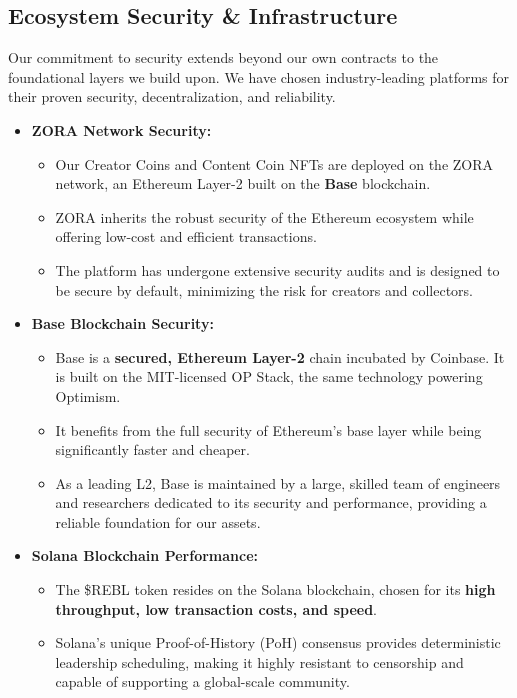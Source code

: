 \documentclass{article}
\begin{document}
\begin{tcolorbox}[colback=headerColor!10!white, colframe=headerColor, boxrule=2pt, width=\textwidth, arc=6mm, left=8mm, right=8mm, top=6mm, bottom=6mm]
\subsection[
  \texorpdfstring{\color{primaryColor}Ecosystem Security \& Infrastructure}{Ecosystem Security \& Infrastructure}
]{\color{primaryColor}\textbf{Ecosystem Security \& Infrastructure}}

Our commitment to security extends beyond our own contracts to the foundational layers we build upon. We have chosen industry-leading platforms for their proven security, decentralization, and reliability.

\begin{itemize}
    \item \textbf{ZORA Network Security:}
    \begin{itemize}
        \item Our Creator Coins and Content Coin NFTs are deployed on the ZORA network, an Ethereum Layer-2 built on the \textbf{Base} blockchain.
        \item ZORA inherits the robust security of the Ethereum ecosystem while offering low-cost and efficient transactions.
        \item The platform has undergone extensive security audits and is designed to be secure by default, minimizing the risk for creators and collectors.
    \end{itemize}
    \item \textbf{Base Blockchain Security:}
    \begin{itemize}
        \item Base is a \textbf{secured, Ethereum Layer-2} chain incubated by Coinbase. It is built on the MIT-licensed OP Stack, the same technology powering Optimism.
        \item It benefits from the full security of Ethereum's base layer while being significantly faster and cheaper.
        \item As a leading L2, Base is maintained by a large, skilled team of engineers and researchers dedicated to its security and performance, providing a reliable foundation for our assets.
    \end{itemize}
    \item \textbf{Solana Blockchain Performance:}
    \begin{itemize}
        \item The \$REBL token resides on the Solana blockchain, chosen for its \textbf{high throughput, low transaction costs, and speed}.
        \item Solana's unique Proof-of-History (PoH) consensus provides deterministic leadership scheduling, making it highly resistant to censorship and capable of supporting a global-scale community.
    \end{itemize}
\end{itemize}


\end{tcolorbox}
\end{document}
